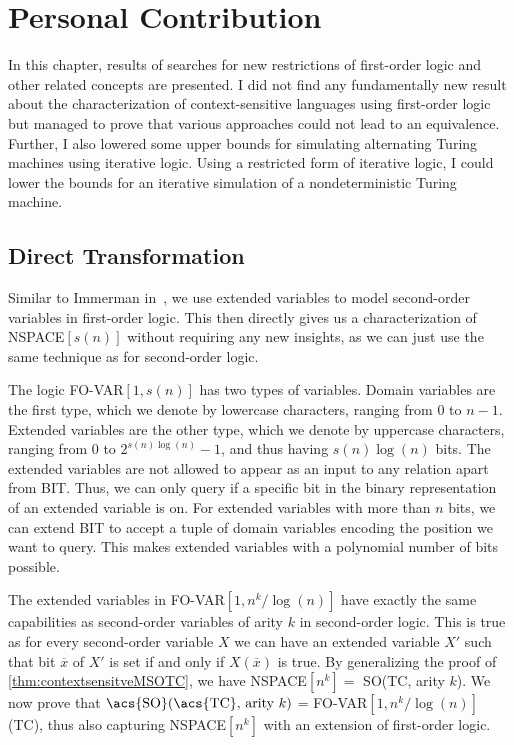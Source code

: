 \chapter{Personal Contribution}\label{ch:personal-contribution}

In this chapter, results of searches for new restrictions of first-order logic and other related concepts are presented.
I did not find any fundamentally new result about the characterization of context-sensitive languages using first-order logic but managed to prove that various approaches could not lead to an equivalence.
Further, I also lowered some upper bounds for simulating alternating Turing machines using iterative logic.
Using a restricted form of iterative logic, I could lower the bounds for an iterative simulation of a nondeterministic Turing machine.


\section{Direct Transformation}\label{sec:direct-transformation}

Similar to Immerman in~\cite{descriptive-complexity}, we use extended variables to model second-order variables in first-order logic.
This then directly gives us a characterization of \acs{NSPACE}$[s(n)]$ without requiring any new insights, as we can just use the same technique as for second-order logic.

\begin{define}
    The logic \acs{FO-VAR}$[1, s(n)]$ has two types of variables.
    Domain variables are the first type, which we denote by lowercase characters, ranging from $0$ to $n - 1$.
    Extended variables are the other type, which we denote by uppercase characters, ranging from $0$ to $2^{s(n)\log(n)} - 1$, and thus having $s(n)\log(n)$ bits.
    The extended variables are not allowed to appear as an input to any relation apart from \acs{BIT}\@.
    Thus, we can only query if a specific bit in the binary representation of an extended variable is on.
    For extended variables with more than $n$ bits, we can extend \acs{BIT} to accept a tuple of domain variables encoding the position we want to query.
    This makes extended variables with a polynomial number of bits possible.
\end{define}

The extended variables in \acs{FO-VAR}$[1, n^k / \log(n)]$ have exactly the same capabilities as second-order variables of arity $k$ in second-order logic.
This is true as for every second-order variable $X$ we can have an extended variable $X'$ such that bit $\overline{x}$ of $X'$ is set if and only if $X(\overline{x})$ is true.
By generalizing the proof of \cref{thm:contextsensitveMSOTC}, we have \acs{NSPACE}$[n^k] = $ \acs{SO}(\acs{TC}, arity $k$).
We now prove that ${\text{\acs{SO}(\acs{TC}, arity }k\text{)}}$ = \acs{FO-VAR}$[1, n^k/\log(n)]$(\acs{TC}), thus also capturing \acs{NSPACE}$[n^k]$ with an extension of first-order logic.

